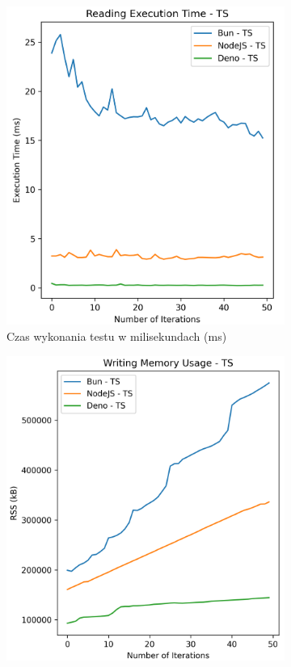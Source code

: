 \begin{figure}[H]
  \centering
  \begin{subfigure}[b]{0.44\textwidth}
    \centering
    \includegraphics[width=\textwidth]{Figures/files/files_writing_50_500_50_ts_time.png}
    \caption{Czas wykonania testu w milisekundach (ms)}
    \label{fig:file_e1_writing_ts_time}
  \end{subfigure}
  \begin{subfigure}[b]{0.44\textwidth}
    \centering
    \includegraphics[width=\textwidth]{Figures/files/files_writing_50_500_50_ts_memory.png}

\end{subfigure}
\end{figure}
